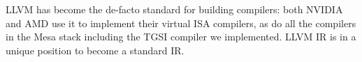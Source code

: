LLVM has become the de-facto standard for building compilers:
both NVIDIA and AMD use it to implement their virtual ISA compilers,
as do all the compilers in the Mesa stack including the TGSI compiler we implemented.
LLVM IR is in a unique position to become a standard IR.



